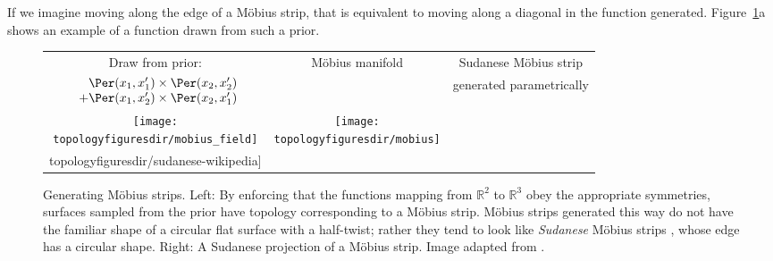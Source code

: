 If we imagine moving along the edge of a M\"{o}bius strip, that is equivalent to moving along a diagonal in the function generated.
Figure~\ref{fig:mobius}a shows an example of a function drawn from such a prior.
%
\begin{figure}
\begin{tabular}[t]{c|c|c}
\centering
Draw from \gp{} prior: &  M\"{o}bius manifold & Sudanese M\"{o}bius strip \\
$\begin{array}{r@{}l@{}}
&\Per(x_1, x_1') \times \Per(x_2, x_2') \\
          + & \Per(x_1, x_2') \times \Per(x_2, x_1')
\end{array}$
& & generated parametrically\\
\texttt{[image: \\topologyfiguresdir/mobius\_field]} & 
\texttt{[image: \\topologyfiguresdir/mobius]} &
\raisebox{1cm}{\texttt{[image: \\topologyfiguresdir/sudanese-wikipedia]}}
\end{tabular}
\caption[Generating M\"{o}bius strips]{Generating M\"{o}bius strips.
Left: By enforcing that the functions mapping from $\mathbb{R}^2$ to $\mathbb{R}^3$ obey the appropriate symmetries, surfaces sampled from the prior have topology corresponding to a M\"{o}bius strip.
M\"{o}bius strips generated this way do not have the familiar shape of a circular flat surface with a half-twist; rather they tend to look like \emph{Sudanese} M\"{o}bius strips \citep{sudanese1984}, whose edge has a circular shape.
Right: A Sudanese projection of a M\"{o}bius strip.
Image adapted from \citep{sudanesepict}.
}
\label{fig:mobius}
\end{figure}
